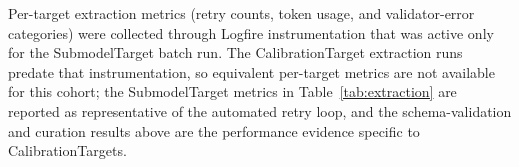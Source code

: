 Per-target extraction metrics (retry counts, token usage, and validator-error categories) were collected through Logfire instrumentation that was active only for the SubmodelTarget batch run. The CalibrationTarget extraction runs predate that instrumentation, so equivalent per-target metrics are not available for this cohort; the SubmodelTarget metrics in Table~\ref{tab:extraction} are reported as representative of the automated retry loop, and the schema-validation and curation results above are the performance evidence specific to CalibrationTargets.
